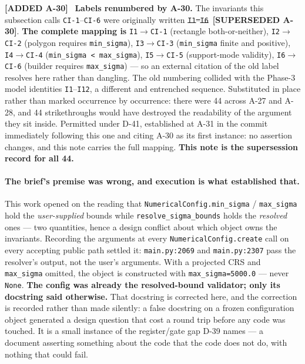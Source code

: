 \documentclass[
  10pt,
]{article}
\newcommand{\amdstrike}[1]{\sout{#1}}
\newcommand{\amdstrike}[1]{\textcolor{supcolor}{#1}}
\newcommand{\amdnew}[1]{{\color{amdcolor}\footnotesize\textbf{[ADDED #1]}}\ }
\newcommand{\supsd}[2]{{\color{supcolor}\amdstrike{#2}}~{\color{amdcolor}\footnotesize\textbf{[SUPERSEDED #1]}}}
\begin{document}
\amdnew{A-30} \textbf{Labels renumbered by A-30.} The invariants this subsection calls \texttt{CI-1}--\texttt{CI-6} were originally written \supsd{A-30}{\texttt{I1}--\texttt{I6}}. \textbf{The complete mapping is} \texttt{I1}$\rightarrow$\texttt{CI-1} (rectangle both-or-neither), \texttt{I2}$\rightarrow$\texttt{CI-2} (polygon requires \texttt{min\_sigma}), \texttt{I3}$\rightarrow$\texttt{CI-3} (\texttt{min\_sigma} finite and positive), \texttt{I4}$\rightarrow$\texttt{CI-4} (\texttt{min\_sigma < max\_sigma}), \texttt{I5}$\rightarrow$\texttt{CI-5} (support-mode validity), \texttt{I6}$\rightarrow$\texttt{CI-6} (builder requires \texttt{max\_sigma}) --- so an external citation of the old label resolves here rather than dangling. The old numbering collided with the Phase-3 model identities \texttt{I1}--\texttt{I12}, a different and entrenched sequence. Substituted in place rather than marked occurrence by occurrence: there were 44 across A-27 and A-28, and 44 strikethroughs would have destroyed the readability of the argument they sit inside. Permitted under D-41, established at A-31 in the commit immediately following this one and citing A-30 as its first instance: no assertion changes, and this note carries the full mapping. \textbf{This note is the supersession record for all 44.}

\paragraph{The brief's premise was wrong, and execution is what established that.}
This work opened on the reading that \texttt{NumericalConfig.min\_sigma} / \texttt{max\_sigma} hold the \emph{user-supplied} bounds while \texttt{resolve\_sigma\_bounds} holds the \emph{resolved} ones --- two quantities, hence a design conflict about which object owns the invariants. Recording the arguments at every \texttt{NumericalConfig.create} call on every accepting public path settled it: \texttt{main.py:2069} and \texttt{main.py:2307} pass the resolver's output, not the user's arguments. With a projected CRS and \texttt{max\_sigma} omitted, the object is constructed with \texttt{max\_sigma=5000.0} --- never \texttt{None}. \textbf{The config was already the resolved-bound validator; only its docstring said otherwise.} That docstring is corrected here, and the correction is recorded rather than made silently: a false docstring on a frozen configuration object generated a design question that cost a round trip before any code was touched. It is a small instance of the register/gate gap D-39 names --- a document asserting something about the code that the code does not do, with nothing that could fail.
\end{document}
